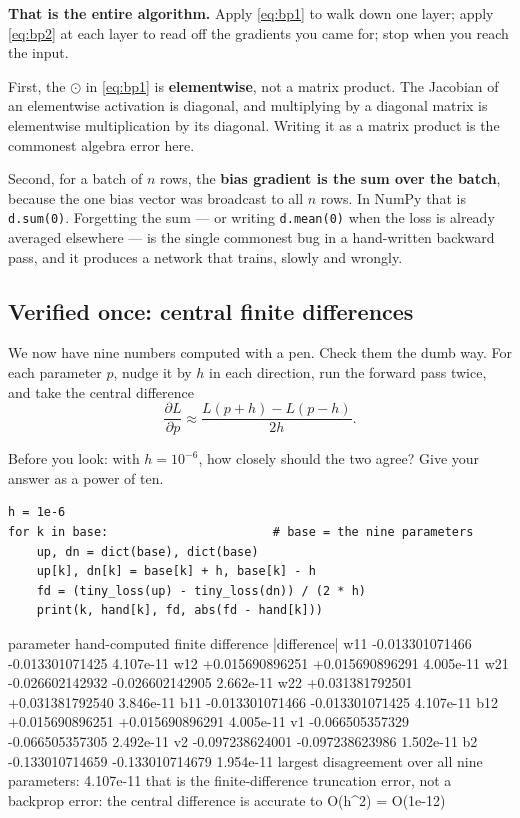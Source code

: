 \documentclass[11pt]{article}
\begin{document}
\textbf{That is the entire algorithm.} Apply \eqref{eq:bp1} to walk down one
layer; apply \eqref{eq:bp2} at each layer to read off the gradients you came
for; stop when you reach the input.

\begin{caution}
First, the $\odot$ in \eqref{eq:bp1} is \textbf{elementwise}, not a matrix
product. The Jacobian of an elementwise activation is diagonal, and
multiplying by a diagonal matrix is elementwise multiplication by its
diagonal. Writing it as a matrix product is the commonest algebra error here.

Second, for a batch of $n$ rows, the \textbf{bias gradient is the sum over the
batch}, because the one bias vector was broadcast to all $n$ rows. In NumPy
that is \texttt{d.sum(0)}. Forgetting the sum --- or writing
\texttt{d.mean(0)} when the loss is already averaged elsewhere --- is the
single commonest bug in a hand-written backward pass, and it produces a
network that trains, slowly and wrongly.
\end{caution}

\subsection{Verified once: central finite differences}
\label{sec:gradcheck}

We now have nine numbers computed with a pen. Check them the dumb way. For
each parameter $p$, nudge it by $h$ in each direction, run the forward pass
twice, and take the central difference
\begin{equation}
  \frac{\partial L}{\partial p} \approx
  \frac{L(p + h) - L(p - h)}{2h}.
  \label{eq:fd}
\end{equation}

Before you look: with $h = 10^{-6}$, how closely should the two agree? Give
your answer as a power of ten.

\begin{lstlisting}
h = 1e-6
for k in base:                       # base = the nine parameters
    up, dn = dict(base), dict(base)
    up[k], dn[k] = base[k] + h, base[k] - h
    fd = (tiny_loss(up) - tiny_loss(dn)) / (2 * h)
    print(k, hand[k], fd, abs(fd - hand[k]))
\end{lstlisting}
\begin{codeout}
parameter   hand-computed      finite difference    |difference|
   w11      -0.013301071466     -0.013301071425     4.107e-11
   w12      +0.015690896251     +0.015690896291     4.005e-11
   w21      -0.026602142932     -0.026602142905     2.662e-11
   w22      +0.031381792501     +0.031381792540     3.846e-11
   b11      -0.013301071466     -0.013301071425     4.107e-11
   b12      +0.015690896251     +0.015690896291     4.005e-11
   v1       -0.066505357329     -0.066505357305     2.492e-11
   v2       -0.097238624001     -0.097238623986     1.502e-11
   b2       -0.133010714659     -0.133010714679     1.954e-11
largest disagreement over all nine parameters: 4.107e-11
that is the finite-difference truncation error, not a backprop error:
   the central difference is accurate to O(h^2) = O(1e-12)
\end{codeout}
\end{document}
